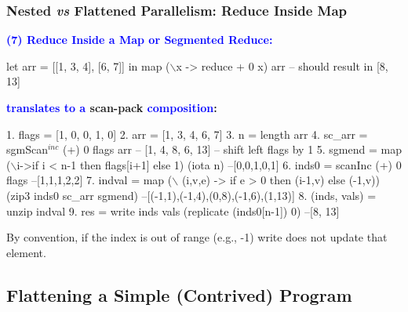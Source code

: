 \documentclass{beamer}
\newcommand{\blue}[1]{\textcolor{Blue}{{#1}}}
\renewcommand{\emph}[1]{\textcolor{structure}{#1}}
\newcommand{\emp}[1]{\textcolor{DikuRed}{ #1}}
\newcommand{\mymath}[1]{$ #1 $}
\newcommand{\myindu}[1]{^{#1}}
\begin{document}
\begin{frame}[fragile,t]
  \frametitle{Nested {\it vs} Flattened Parallelism: Reduce Inside Map}

\blue{\bf (7) Reduce Inside a Map or Segmented Reduce:} 

\begin{colorcode}[fontsize=\scriptsize]
let arr = [[1, 3, 4], [6, 7]] in
map (\mymath{\backslash}x -> reduce + 0 x) arr 
-- should result in [8, 13]
\end{colorcode}

\bigskip
\pause

\textbf{\blue{translates to a} \emp{scan-}\emph{pack} \blue{composition}:}
\bigskip

\begin{colorcode}[fontsize=\scriptsize]
1. flags  = [1, 0, 0, 1, 0]
2. arr    = [1, 3, 4, 6, 7]
3. n      = length arr
4. sc_arr = \emp{sgmScan\mymath{\myindu{inc}}} (+) 0 flags arr -- [1, 4, 8, 6, 13]
-- shift left flags by 1
5. sgmend = map (\mymath{\backslash}i->if i < n-1 then flags[i+1] else 1) (iota n) --[0,0,1,0,1]
6. inds0  = \emp{scanInc} (+) 0 flags                                  --[1,1,1,2,2]
7. indval = map (\mymath{\backslash} (i,v,e) -> if e > 0 then (i-1,v) else (-1,v))  
                (zip3 inds0 sc_arr sgmend) --[(-1,1),(-1,4),(0,8),(-1,6),(1,13)]
8. (inds, vals) = unzip indval
9. res    = \emph{write} inds vals (replicate (inds0[n-1]) 0) --[8, 13]
\end{colorcode}

\alert{By convention, if the index is out of range (e.g., -1) write does not update that element.}

\end{frame}



\subsection{Flattening a Simple (Contrived) Program}

\begin{frame}[fragile]
	\tableofcontents[currentsubsection]
\end{frame}
\end{document}
